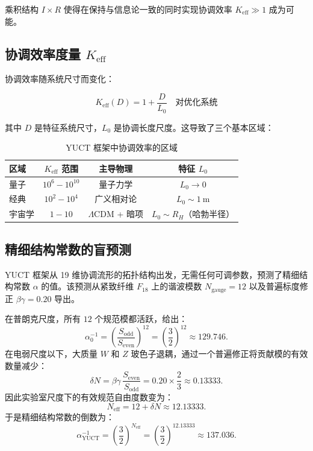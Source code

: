 \documentclass[11pt,a4paper]{article}
\theoremstyle{remark}
\newcommand{\Keff}{K_{\mathrm{eff}}}
\begin{document}
	乘积结构 $I \times R$ 使得在保持与信息论一致的同时实现协调效率 $\Keff \gg 1$ 成为可能。
	
	\subsection[协调效率度量 K eff]{协调效率度量 $\Keff$}
	
	协调效率随系统尺寸而变化：
	
	\begin{equation}
		\Keff(D) = 1 + \frac{D}{L_0} \quad \text{对优化系统}
	\end{equation}
	
	其中 $D$ 是特征系统尺寸，$L_0$ 是协调长度尺度。这导致了三个基本区域：
	
	\begin{table}[htbp]
		\centering
		\begin{tabular}{lccc}
			\toprule
			\textbf{区域} & \textbf{$\Keff$ 范围} & \textbf{主导物理} & \textbf{特征 $L_0$} \\
			\midrule
			量子 & $10^6 - 10^{10}$ & 量子力学 & $L_0 \to 0$ \\
			经典 & $10^2 - 10^4$ & 广义相对论 & $L_0 \sim 1\ \text{m}$ \\
			宇宙学 & $1 - 10$ & $\Lambda$CDM + 暗项 & $L_0 \sim R_H$（哈勃半径） \\
			\bottomrule
		\end{tabular}
		\caption{YUCT 框架中协调效率的区域}
		\label{tab:keff-regimes}
	\end{table}
	
	\subsection{精细结构常数的盲预测}
	\label{subsec:blind_alpha}
	
	YUCT 框架从 19 维协调流形的拓扑结构出发，无需任何可调参数，预测了精细结构常数 $\alpha$ 的值。该预测从紧致纤维 $F_{18}$ 上的谐波模数 $N_{\mathrm{gauge}} = 12$ 以及普遍标度修正 $\beta\gamma = 0.20$ 导出。
	
	在普朗克尺度，所有 $12$ 个规范模都活跃，给出：
	\[
	\alpha_0^{-1} = \left(\frac{S_{\mathrm{odd}}}{S_{\mathrm{even}}}\right)^{12}
	= \left(\frac{3}{2}\right)^{12} \approx 129.746 .
	\]
	在电弱尺度以下，大质量 $W$ 和 $Z$ 玻色子退耦，通过一个普遍修正将贡献模的有效数量减少：
	\[
	\delta N = \beta\gamma \, \frac{S_{\mathrm{even}}}{S_{\mathrm{odd}}}
	= 0.20 \times \frac{2}{3} \approx 0.13333 .
	\]
	因此实验室尺度下的有效规范自由度数变为：
	\[
	N_{\mathrm{eff}} = 12 + \delta N \approx 12.13333 .
	\]
	于是精细结构常数的倒数为：
	\[
	\boxed{\alpha^{-1}_{\mathrm{YUCT}} = \left(\frac{3}{2}\right)^{N_{\mathrm{eff}}}
		= \left(\frac{3}{2}\right)^{12.13333} \approx 137.036 } .
	\]
	
\end{document}
